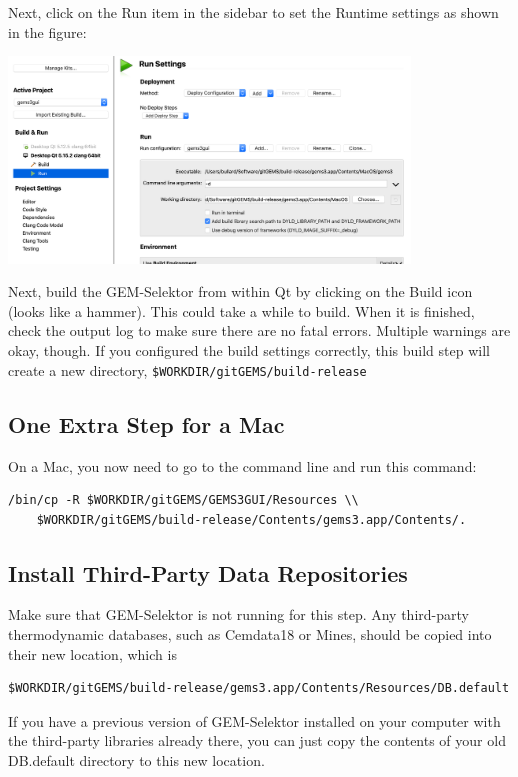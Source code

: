 \documentclass{article}
\begin{document}
Next, click on the Run item in the sidebar to set the Runtime settings as shown in the figure:

\begin{center}
    \includegraphics[width=0.8\textwidth]{Figures/Qt-run-settings.png}
\end{center}

Next, build the GEM-Selektor from within Qt by clicking on the Build icon (looks like a hammer).
This could take a while to build.  When it is finished, check the output log to make sure there
are no fatal errors.  Multiple warnings are okay, though.  If you configured the build settings
correctly, this build step will create a new directory, \verb!$WORKDIR/gitGEMS/build-release!

\subsection{One Extra Step for a Mac}
On a Mac, you now need to go to the command line and run this command:
\begin{verbatim}
/bin/cp -R $WORKDIR/gitGEMS/GEMS3GUI/Resources \\
    $WORKDIR/gitGEMS/build-release/Contents/gems3.app/Contents/.
\end{verbatim}

\subsection{Install Third-Party Data Repositories}
Make sure that GEM-Selektor is not running for this step.
Any third-party thermodynamic databases, such as Cemdata18 or Mines, should be copied into
their new location, which is
\begin{verbatim}
$WORKDIR/gitGEMS/build-release/gems3.app/Contents/Resources/DB.default
\end{verbatim}

If you have a previous version of GEM-Selektor installed on your computer with
the third-party libraries already there, you can just copy the contents of your old
DB.default directory to this new location.
\end{document}
